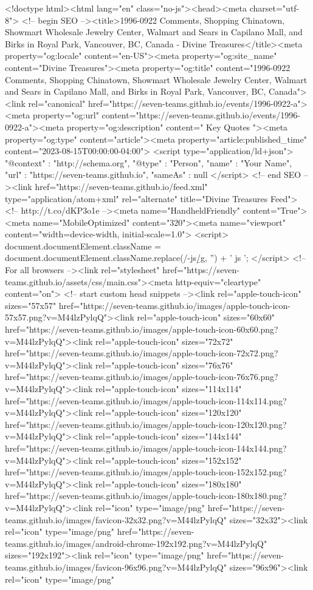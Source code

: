 <!doctype html><html lang="en" class="no-js"><head><meta charset="utf-8"> <!-- begin SEO --><title>1996-0922 Comments, Shopping Chinatown, Showmart Wholesale Jewelry Center, Walmart and Sears in Capilano Mall, and Birks in Royal Park, Vancouver, BC, Canada - Divine Treasures</title><meta property="og:locale" content="en-US"><meta property="og:site_name" content="Divine Treasures"><meta property="og:title" content="1996-0922 Comments, Shopping Chinatown, Showmart Wholesale Jewelry Center, Walmart and Sears in Capilano Mall, and Birks in Royal Park, Vancouver, BC, Canada"><link rel="canonical" href="https://seven-teams.github.io/events/1996-0922-a"><meta property="og:url" content="https://seven-teams.github.io/events/1996-0922-a"><meta property="og:description" content=" Key Quotes "><meta property="og:type" content="article"><meta property="article:published_time" content="2023-08-15T00:00:00-04:00"> <script type="application/ld+json"> { "@context" : "http://schema.org", "@type" : "Person", "name" : "Your Name", "url" : "https://seven-teams.github.io", "sameAs" : null } </script> <!-- end SEO --><link href="https://seven-teams.github.io/feed.xml" type="application/atom+xml" rel="alternate" title="Divine Treasures Feed"> <!-- http://t.co/dKP3o1e --><meta name="HandheldFriendly" content="True"><meta name="MobileOptimized" content="320"><meta name="viewport" content="width=device-width, initial-scale=1.0"> <script> document.documentElement.className = document.documentElement.className.replace(/\bno-js\b/g, '') + ' js '; </script> <!-- For all browsers --><link rel="stylesheet" href="https://seven-teams.github.io/assets/css/main.css"><meta http-equiv="cleartype" content="on"> <!-- start custom head snippets --><link rel="apple-touch-icon" sizes="57x57" href="https://seven-teams.github.io/images/apple-touch-icon-57x57.png?v=M44lzPylqQ"><link rel="apple-touch-icon" sizes="60x60" href="https://seven-teams.github.io/images/apple-touch-icon-60x60.png?v=M44lzPylqQ"><link rel="apple-touch-icon" sizes="72x72" href="https://seven-teams.github.io/images/apple-touch-icon-72x72.png?v=M44lzPylqQ"><link rel="apple-touch-icon" sizes="76x76" href="https://seven-teams.github.io/images/apple-touch-icon-76x76.png?v=M44lzPylqQ"><link rel="apple-touch-icon" sizes="114x114" href="https://seven-teams.github.io/images/apple-touch-icon-114x114.png?v=M44lzPylqQ"><link rel="apple-touch-icon" sizes="120x120" href="https://seven-teams.github.io/images/apple-touch-icon-120x120.png?v=M44lzPylqQ"><link rel="apple-touch-icon" sizes="144x144" href="https://seven-teams.github.io/images/apple-touch-icon-144x144.png?v=M44lzPylqQ"><link rel="apple-touch-icon" sizes="152x152" href="https://seven-teams.github.io/images/apple-touch-icon-152x152.png?v=M44lzPylqQ"><link rel="apple-touch-icon" sizes="180x180" href="https://seven-teams.github.io/images/apple-touch-icon-180x180.png?v=M44lzPylqQ"><link rel="icon" type="image/png" href="https://seven-teams.github.io/images/favicon-32x32.png?v=M44lzPylqQ" sizes="32x32"><link rel="icon" type="image/png" href="https://seven-teams.github.io/images/android-chrome-192x192.png?v=M44lzPylqQ" sizes="192x192"><link rel="icon" type="image/png" href="https://seven-teams.github.io/images/favicon-96x96.png?v=M44lzPylqQ" sizes="96x96"><link rel="icon" type="image/png" 